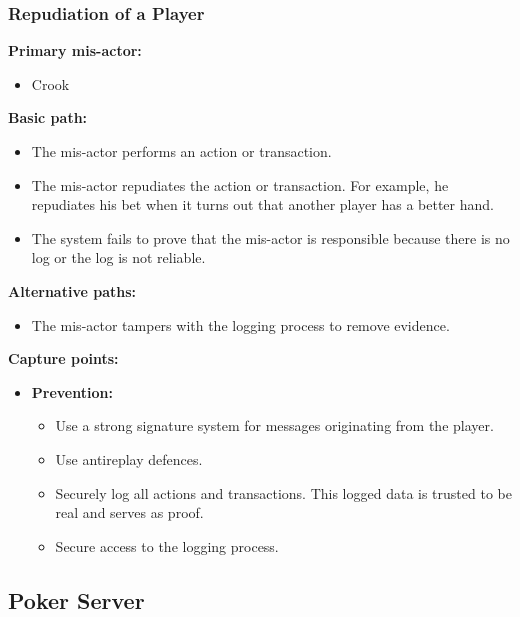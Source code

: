 \documentclass[a4paper,11pt]{report}
\begin{document}
\subsubsection{Repudiation of a Player}
\label{PlayerCasesR}
\label{Repudiation of a Player}
\textbf{Primary mis-actor:}
\begin{itemize}
\item Crook
\end{itemize}
\textbf{Basic path:}
\begin{itemize}
\item The mis-actor performs an action or transaction.
\item The mis-actor repudiates the action or transaction. For example, he repudiates his bet when it turns out that another player has a better hand.
\item The system fails to prove that the mis-actor is responsible because there is no log or the log is not reliable.
\end{itemize}
\textbf{Alternative paths:}
\begin{itemize}
\item The mis-actor tampers with the logging process to remove evidence.
\end{itemize}
\textbf{Capture points:}
\begin{itemize}
\item \textbf{Prevention:}
\begin{itemize}
\item Use a strong signature system for messages originating from the player.
\item Use antireplay defences.
\item Securely log all actions and transactions. This logged data is trusted to be real and serves as proof.
\item Secure access to the logging process.
\end{itemize}
\end{itemize}

\subsection{Poker Server}
\label{PokerServerCases}
\end{document}
